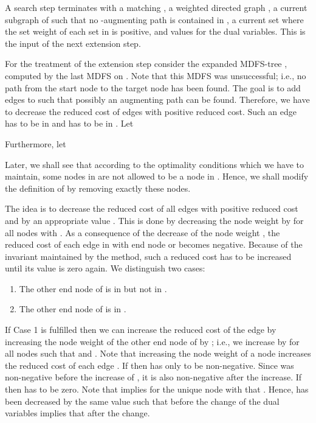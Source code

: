 \documentclass[12pt,twoside,a4paper]{article}
\begin{document}
A search step terminates with a matching , a weighted directed graph
, a current subgraph  of  such that
no -augmenting path  is contained in , a current set  where
the set weight of each set in  is positive, and values 
for the dual variables. This is the input of the next extension step.

For the treatment of the extension step consider the expanded MDFS-tree 
, computed by the last MDFS on . Note that this MDFS was 
unsuccessful; i.e., no path from the start node  to the target node  has been 
found. The goal is to add edges to  such that 
possibly an augmenting path can be found. Therefore, we have to decrease the 
reduced cost of edges with positive reduced cost. Such an edge  has to 
be in  and  has to be in . Let

Furthermore, let

Later, we shall see that according to the optimality
conditions which we have to maintain, some nodes in  are
not allowed to be a node in . Hence, we shall modify the definition of
 by removing exactly these nodes.

The idea is to decrease the reduced cost  of all edges  with 
positive reduced cost and  by an appropriate value .
This is done by decreasing the node weight  by  for all nodes 
 with .
As a consequence of the decrease of the node weight , the reduced cost
of each edge  in  with end node  or  becomes negative. 
Because of the invariant maintained by the method, such a reduced cost has to be increased 
until its value is zero again. We distinguish two cases:
\begin{enumerate}
\item
The other end node of  is in  but not in .
\item
The other end node of  is in .
\end{enumerate}
If Case 1 is fulfilled then we can increase the reduced cost of the edge  by 
increasing the node weight of the other end node of  by ; i.e.,
we increase  by  for all nodes  such that 
and .
Note that increasing the node weight  of a node  increases the reduced 
cost of each edge .
If  then  has only to be non-negative. Since
 was non-negative before the increase of , it is also non-negative after 
the increase. If  then  has to be zero. Note that 
implies for the unique node  with  that .
Hence,  has been decreased by the same value such that  
before the change of the dual variables implies that  after the
change.
\end{document}
